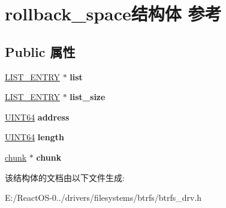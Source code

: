 \hypertarget{structrollback__space}{}\section{rollback\+\_\+space结构体 参考}
\label{structrollback__space}
\subsection*{Public 属性}
\begin{DoxyCompactItemize}
\item 
\mbox{\label{structrollback__space_abaca6ef8c87fef1be8d163df92bac92d}} 
\hyperlink{struct___l_i_s_t___e_n_t_r_y}{L\+I\+S\+T\+\_\+\+E\+N\+T\+RY} $\ast$ {\bfseries list}
\item 
\mbox{\label{structrollback__space_a3938be64ecabf8aab618df2c2526e63d}} 
\hyperlink{struct___l_i_s_t___e_n_t_r_y}{L\+I\+S\+T\+\_\+\+E\+N\+T\+RY} $\ast$ {\bfseries list\+\_\+size}
\item 
\mbox{\label{structrollback__space_a6c6dfc4c861f25e505d2a439ecf16f74}} 
\hyperlink{_processor_bind_8h_a57be03562867144161c1bfee95ca8f7c}{U\+I\+N\+T64} {\bfseries address}
\item 
\mbox{\label{structrollback__space_a30c1eba5a5f94aa2f54128b057a1cefe}} 
\hyperlink{_processor_bind_8h_a57be03562867144161c1bfee95ca8f7c}{U\+I\+N\+T64} {\bfseries length}
\item 
\mbox{\label{structrollback__space_abac52a45fa86a06f640c08b81fd55eeb}} 
\hyperlink{structchunk}{chunk} $\ast$ {\bfseries chunk}
\end{DoxyCompactItemize}


该结构体的文档由以下文件生成\+:\begin{DoxyCompactItemize}
\item 
E\+:/\+React\+O\+S-\/0../drivers/filesystems/btrfs/btrfs\+\_\+drv.\+h\end{DoxyCompactItemize}
